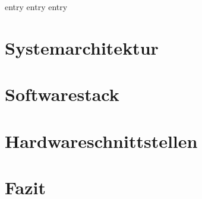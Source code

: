 \documentclass[headsepline,footsepline,footinclude=false,oneside,fontsize=11pt,paper=a4,listof=totoc,bibliography=totoc]{scrbook} %
\begin{document}

\frontmatter{}




\tableofcontents{}

\mainmatter{}

{entry}
{entry}
{entry}

\chapter{Systemarchitektur}
\chapter{Softwarestack}
\chapter{Hardwareschnittstellen}
\chapter{Fazit}

\appendix{}

\todos{}
\listoffigures{}
\listoftables{}
\printbibliography{}
\end{document}
